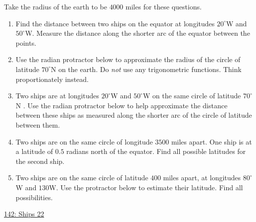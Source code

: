 \documentclass{ximera}
\begin{document}
\begin{question} \label{QPPPdfrrr3r54g}
Take the radius of the earth to be $4000$ miles for these questions.

\begin{enumerate}
\item Find the distance between two ships on the equator at longitudes $20^\circ$W and $50^\circ$W. Measure the distance along the shorter arc of the equator between the points. %

\item Use the radian protractor below to approximate the radius of the circle of latitude $70^\circ$N on the earth. Do \emph{not} use any trigonometric functions. Think proportionately instead.

\item Two ships are at longitudes $20^\circ$W and $50^\circ$W on the same circle of latitude $70^\circ$N . Use the radian protractor below to help approximate the distance between these ships as measured along the shorter arc of the circle of latitude between them.

\item Two ships are on the same circle of longitude $3500$ miles apart. One ship is at a latitude of $0.5$ radians north of the equator. Find all possible latitudes for the second ship. 

\item Two ships are on the same circle of latitude $400$ miles apart, at longitudes $80^\circ$W and $130$W. Use the protractor below to estimate their latitude. Find all possibilities.  
 
 
\end{enumerate}

\begin{onlineOnly}
    \begin{center}
\end{center}

\href{https://www.desmos.com/calculator/fmjbqszyge}{142: Ships 22}

\end{onlineOnly}
\end{question}
\end{document}
